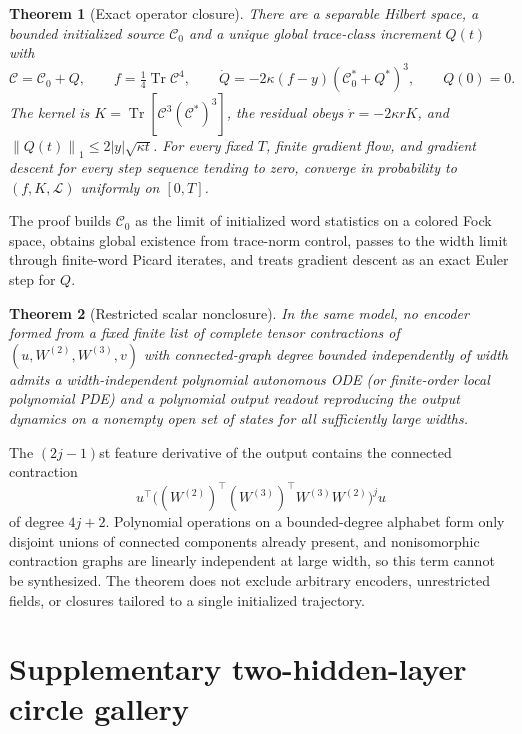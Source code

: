 \documentclass[11pt]{article}
\newtheorem{theorem}{Theorem}[section]
\theoremstyle{definition}
\theoremstyle{remark}
\newcommand{\cL}{\mathcal{L}}
\newcommand{\norm}[1]{\left\lVert #1\right\rVert}
\begin{document}
\begin{theorem}[Exact operator closure]
\label{thm:operator}
There are a separable Hilbert space, a bounded initialized source $\mathcal C_0$
and a unique global trace-class increment $Q(t)$ with
\[
 \mathcal C=\mathcal C_0+Q,\qquad f=\tfrac14\operatorname{Tr}\mathcal C^4,\qquad
 \dot Q=-2\kappa(f-y)(\mathcal C_0^*+Q^*)^3,\qquad Q(0)=0 .
\]
The kernel is $K=\operatorname{Tr}[\mathcal C^3(\mathcal C^*)^3]$, the residual
obeys $\dot r=-2\kappa rK$, and $\norm{Q(t)}_1\le2|y|\sqrt{\kappa t}$.  For every
fixed $T$, finite gradient flow, and gradient descent for every step sequence
tending to zero, converge in probability to $(f,K,\cL)$ uniformly on $[0,T]$.
\end{theorem}

The proof builds $\mathcal C_0$ as the limit of initialized word statistics on a
colored Fock space, obtains global existence from trace-norm control, passes to
the width limit through finite-word Picard iterates, and treats gradient descent
as an exact Euler step for $Q$.

\begin{theorem}[Restricted scalar nonclosure]
\label{thm:nonclosure}
In the same model, no encoder formed from a fixed finite list of complete tensor
contractions of $(u,W^{(2)},W^{(3)},v)$ with connected-graph degree bounded
independently of width admits a width-independent polynomial autonomous ODE (or
finite-order local polynomial PDE) and a polynomial output readout reproducing
the output dynamics on a nonempty open set of states for all sufficiently large
widths.
\end{theorem}

The $(2j-1)$st feature derivative of the output contains the connected
contraction
\[
 u^\top\bigl((W^{(2)})^\top(W^{(3)})^\top W^{(3)}W^{(2)}\bigr)^ju
\]
of degree $4j+2$.  Polynomial operations on a bounded-degree alphabet form only
disjoint unions of connected components already present, and nonisomorphic
contraction graphs are linearly independent at large width, so this term cannot
be synthesized.  The theorem does not exclude arbitrary encoders, unrestricted
fields, or closures tailored to a single initialized trajectory.



\clearpage


\clearpage
\section{Supplementary two-hidden-layer circle gallery}
\label{app:circle-gallery}
\end{document}
